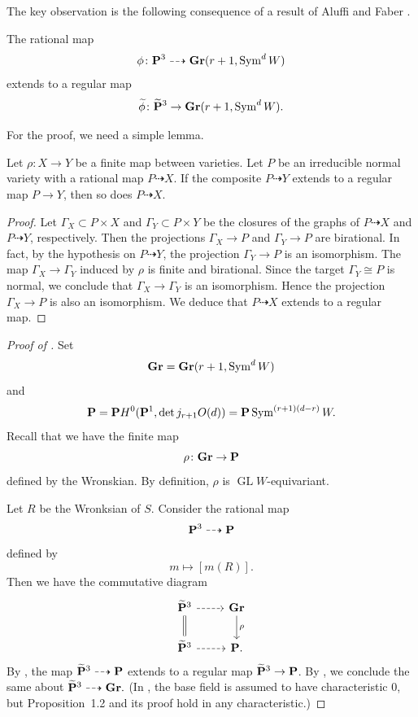 \documentclass[11pt]{amsart}
\renewcommand {\P}{{\bf P}}
\providecommand {\Gr}{{\bf Gr}}
\providecommand{\GL}{\operatorname{GL}}
\providecommand{\Sym}{\operatorname{Sym}}
\begin{document}
The key observation is the  following consequence of a result of Aluffi and Faber \cite{alu.fab:93*1}.
\begin{theorem}\label{thm:res}
  The rational map
  \[\phi \colon \P^{3} \dashrightarrow \Gr(r+1, \Sym^{d}W)\] extends to a regular map
  \[\widetilde \phi \colon \widetilde{\P}^{3} \to \Gr(r+1, \Sym^{d}W).\]
\end{theorem}
For the proof, we need a simple lemma.
\begin{lemma}\label{lem:zmt}
  Let \(\rho \colon X \to Y\) be a finite map between varieties.
  Let \(P\) be an irreducible normal variety with a rational map \(P \dashrightarrow X\).
  If the composite \(P \dashrightarrow Y\) extends to a regular map \(P \to Y\), then so does \(P \dashrightarrow X\).
\end{lemma}
\begin{proof}
  Let \(\Gamma_X \subset P \times X\) and \(\Gamma_Y \subset P \times Y\) be the closures of the graphs of \(P \dashrightarrow X\) and \(P \dashrightarrow Y\), respectively.
  Then the projections \(\Gamma_X \to P\) and \(\Gamma_Y \to P\) are birational.
  In fact, by the hypothesis on \(P \dashrightarrow Y\), the projection \(\Gamma_Y \to P\) is an isomorphism.
  The map \(\Gamma_X \to \Gamma_Y\) induced by \(\rho\) is finite and birational.
  Since the target \(\Gamma_Y \cong P\) is normal, we conclude that \(\Gamma_X \to \Gamma_Y\) is an isomorphism.
  Hence the projection \(\Gamma_X \to P\) is also an isomorphism.
  We deduce that \(P \dashrightarrow X\) extends to a regular map.
\end{proof}

\begin{proof}[Proof of ]
  Set
  \[ \Gr = \Gr(r+1, \Sym^d W)\]
  and
  \[ \P = \P H^0(\P^1, \det j_{r+1} O(d)) = \P \Sym^{(r+1)(d-r)}W.\]
  Recall that we have the finite map
  \[ \rho \colon \Gr \to \P\]
  defined by the Wronskian.
  By definition, \(\rho\) is \(\GL W\)-equivariant.

  Let \(R\) be the Wronksian of \(S\).
  Consider the rational map
  \[ \P^3 \dashrightarrow \P\]
  defined by
  \[ m \mapsto [m(R)].\]
  Then we have the commutative diagram
  \[
    \begin{tikzcd}
      \widetilde \P^3 \ar[dashed]{r} \ar[equal]{d}& \Gr \ar{d}{\rho}  \\
      \widetilde \P^3 \ar[dashed]{r}& \P.
    \end{tikzcd}
  \]
  By \cite[Proposition~1.2]{alu.fab:93*1}, the map \(\widetilde \P^3 \dashrightarrow \P\) extends to a regular map \(\widetilde \P^3 \to \P\).
  By , we conclude the same about \(\widetilde \P^3 \dashrightarrow \Gr.\)
  (In \cite{alu.fab:93*1}, the base field is assumed to have characteristic 0, but Proposition~1.2 and its proof hold in any characteristic.)
\end{proof}
\end{document}
